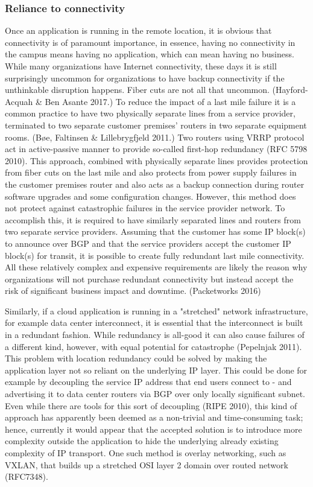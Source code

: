 \documentclass{article}
\begin{document}
\subsubsection{Reliance to connectivity}
Once an application is running in the remote location, it is obvious that connectivity is of paramount importance, in essence, having no connectivity in the campus means having no application, which can mean having no business. While many organizations have Internet connectivity, these days it is still surprisingly uncommon for organizations to have backup connectivity if the unthinkable disruption happens. Fiber cuts are not all that uncommon. (Hayford-Acquah \& Ben Asante 2017.)
To reduce the impact of a last mile failure it is a common practice to have two physically separate lines from a service provider, terminated to two separate customer premises' routers in two separate equipment rooms. (Bøe, Faltinsen \& Lillebrygfjeld 2011.) Two routers using VRRP protocol act in active-passive manner to provide so-called first-hop redundancy (RFC 5798 2010). This approach, combined with physically separate lines provides protection from fiber cuts on the last mile and also protects from power supply failures in the customer premises router and also acts as a backup connection during router software upgrades and some configuration changes.
However, this method does not protect against catastrophic failures in the service provider network. To accomplish this, it is required to have similarly separated lines and routers from two separate service providers. Assuming that the customer has some IP block(s) to announce over BGP and that the service providers accept the customer IP block(s) for transit, it is possible to create fully redundant last mile connectivity. All these relatively complex and expensive requirements are likely the reason why organizations will not purchase redundant connectivity but instead accept the risk of significant business impact and downtime. (Packetworks 2016)
\par
Similarly, if a cloud application is running in a "stretched" network infrastructure, for example data center interconnect, it is essential that the interconnect is built in a redundant fashion. While redundancy is all-good it can also cause failures of a different kind, however, with equal potential for catastrophe (Pepelnjak 2011).
This problem with location redundancy could be solved by making the application layer not so reliant on the underlying IP layer. This could be done for example by decoupling the service IP address that end users connect to - and advertising it to data center routers via BGP over only locally significant subnet. Even while there are tools for this sort of decoupling (RIPE 2010), this kind of approach has apparently been deemed as a non-trivial and time-consuming task; hence, currently it would appear that the accepted solution is to introduce more complexity outside the application to hide the underlying already existing complexity of IP transport. One such method is overlay networking, such as VXLAN, that builds up a stretched OSI layer 2 domain over routed network (RFC7348).
\end{document}

